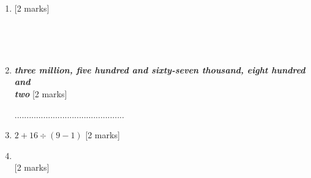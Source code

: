 \documentclass{article}
\begin{document}
\begin{enumerate}
    


\item \quad {}   \hspace{2cm} [2 marks]
 \par
 \vspace{20pt}

\noindent \dotuline{\hspace{17cm}} \\
\par
\noindent \dotuline{\hspace{17cm}} \\
\vspace{10pt}
\hline
\vspace{10pt}

\item \quad {} \textit{\textbf{three million, five hundred and sixty-seven thousand, eight hundred and }} \\
\textit{\textbf{two}}  \hspace{2cm} [2 marks]

 
 \par
 \vspace{60pt}
 ..............................................

 \vspace{20pt}
 \hline
 \vspace{10pt}

\item \quad \( 2 + 16 \div (9 - 1 ) \) \hspace{2cm} [2 marks]
\vspace{80pt}
\hline
\vspace{10pt}



\item \quad {} \\ 
\quad {} \hspace{2cm} [2 marks]
\vspace{100pt}
\hline
\vspace{5pt}


\end{enumerate}
\end{document}
